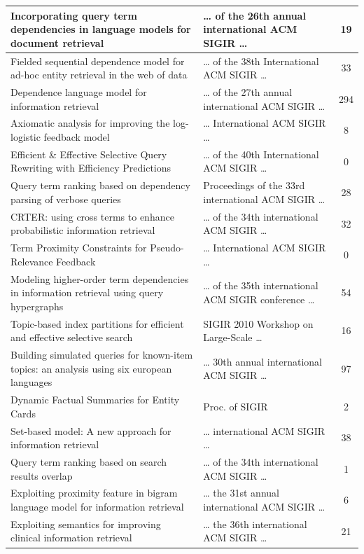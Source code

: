 \documentclass[letterpaper,12pt]{article}
\begin{document}
\begin{longtable}{|p{9cm}|p{5cm}|c|}
Incorporating query term dependencies in language models for document retrieval & … of the 26th annual international ACM SIGIR … & 19  \\ \hline
Fielded sequential dependence model for ad-hoc entity retrieval in the web of data & … of the 38th International ACM SIGIR … & 33  \\ \hline
Dependence language model for information retrieval & … of the 27th annual international ACM SIGIR … & 294  \\ \hline
Axiomatic analysis for improving the log-logistic feedback model & … International ACM SIGIR … & 8  \\ \hline
Efficient \& Effective Selective Query Rewriting with Efficiency Predictions & … of the 40th International ACM SIGIR … & 0  \\ \hline
Query term ranking based on dependency parsing of verbose queries & Proceedings of the 33rd international ACM SIGIR … & 28  \\ \hline
CRTER: using cross terms to enhance probabilistic information retrieval & … of the 34th international ACM SIGIR … & 32  \\ \hline
Term Proximity Constraints for Pseudo-Relevance Feedback & … International ACM SIGIR … & 0  \\ \hline
Modeling higher-order term dependencies in information retrieval using query hypergraphs & … of the 35th international ACM SIGIR conference … & 54  \\ \hline
Topic-based index partitions for efficient and effective selective search & SIGIR 2010 Workshop on Large-Scale … & 16  \\ \hline
Building simulated queries for known-item topics: an analysis using six european languages & … 30th annual international ACM SIGIR … & 97  \\ \hline
Dynamic Factual Summaries for Entity Cards & Proc. of SIGIR & 2  \\ \hline
Set-based model: A new approach for information retrieval & … international ACM SIGIR … & 38  \\ \hline
Query term ranking based on search results overlap & … of the 34th international ACM SIGIR … & 1  \\ \hline
Exploiting proximity feature in bigram language model for information retrieval & … the 31st annual international ACM SIGIR … & 6  \\ \hline
Exploiting semantics for improving clinical information retrieval & … the 36th international ACM SIGIR … & 21  \\ \hline

\end{longtable}
\end{document}
